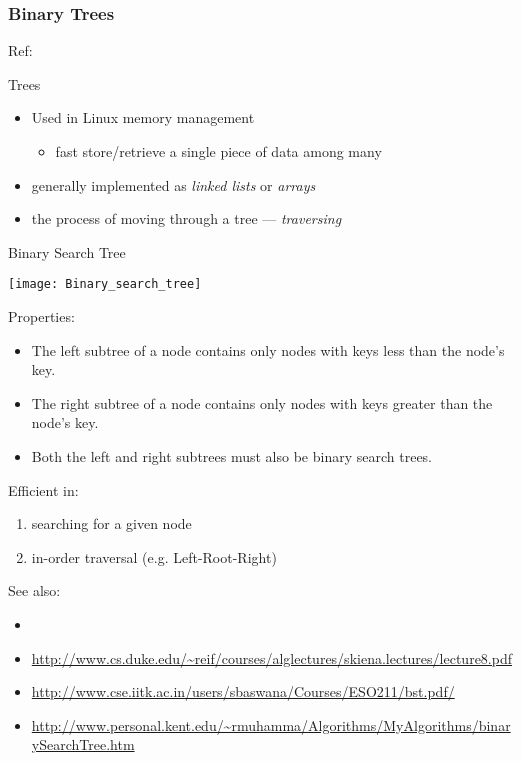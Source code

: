 \subsubsection{Binary Trees}

Ref: 

\begin{frame}{Trees}
  \begin{itemize}
  \item Used in Linux memory management
    \begin{itemize}
    \item fast store/retrieve a single piece of data among many
    \end{itemize}
  \item generally implemented as \emph{linked lists} or \emph{arrays}
  \item the process of moving through a tree --- \emph{traversing}
  \end{itemize}
\end{frame}

\begin{frame}{Binary Search Tree}
  \begin{center}
    \texttt{[image: Binary\_search\_tree]}
  \end{center}
  \begin{block}{Properties:}
    \begin{itemize}
    \item The left subtree of a node contains only nodes with keys less than the node's
      key.
    \item The right subtree of a node contains only nodes with keys greater than the
      node's key.
    \item Both the left and right subtrees must also be binary search trees.
    \end{itemize}
  \end{block}
  Efficient in:
  \begin{enumerate}
  \item searching for a given node
  \item in-order traversal (e.g. Left-Root-Right)
  \end{enumerate}
\end{frame}

See also:
\begin{itemize}
\item {}
\item \url{http://www.cs.duke.edu/~reif/courses/alglectures/skiena.lectures/lecture8.pdf}
\item \url{http://www.cse.iitk.ac.in/users/sbaswana/Courses/ESO211/bst.pdf/}
\item \url{http://www.personal.kent.edu/~rmuhamma/Algorithms/MyAlgorithms/binarySearchTree.htm}
\end{itemize}

